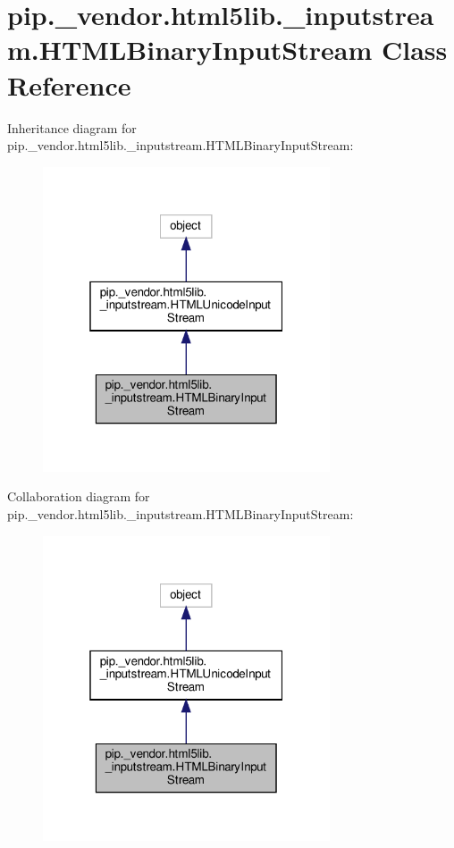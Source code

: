 \hypertarget{classpip_1_1__vendor_1_1html5lib_1_1__inputstream_1_1HTMLBinaryInputStream}{}\section{pip.\+\_\+vendor.\+html5lib.\+\_\+inputstream.\+H\+T\+M\+L\+Binary\+Input\+Stream Class Reference}
\label{classpip_1_1__vendor_1_1html5lib_1_1__inputstream_1_1HTMLBinaryInputStream}


Inheritance diagram for pip.\+\_\+vendor.\+html5lib.\+\_\+inputstream.\+H\+T\+M\+L\+Binary\+Input\+Stream\+:
\nopagebreak
\begin{figure}[H]
\begin{center}
\leavevmode
\includegraphics[width=241pt]{classpip_1_1__vendor_1_1html5lib_1_1__inputstream_1_1HTMLBinaryInputStream__inherit__graph}
\end{center}
\end{figure}


Collaboration diagram for pip.\+\_\+vendor.\+html5lib.\+\_\+inputstream.\+H\+T\+M\+L\+Binary\+Input\+Stream\+:
\nopagebreak
\begin{figure}[H]
\begin{center}
\leavevmode
\includegraphics[width=241pt]{classpip_1_1__vendor_1_1html5lib_1_1__inputstream_1_1HTMLBinaryInputStream__coll__graph}
\end{center}
\end{figure}
